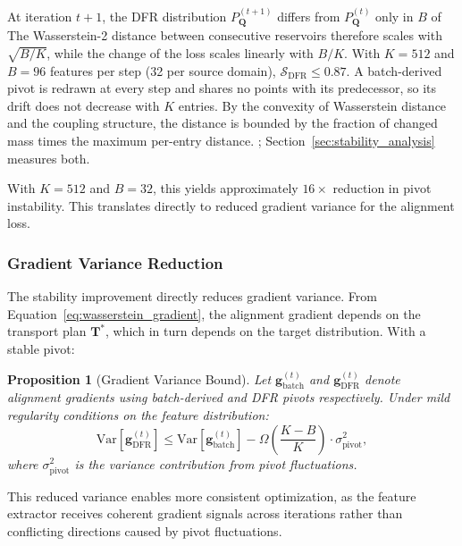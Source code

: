 \documentclass[preprint,12pt]{elsarticle}
\newtheorem{proposition}[theorem]{Proposition}
\providecommand{\DIFadd}[1]{{\protect\color{blue} \sf #1}} %
\providecommand{\DIFdel}[1]{{\protect\color{red} \scriptsize #1}} %
\providecommand{\DIFaddbegin}{} %
\providecommand{\DIFaddend}{} %
\providecommand{\DIFdelbegin}{} %
\providecommand{\DIFdelend}{} %
\newcommand{\DIFscaledelfig}{0.5}
\newlength{\DIFdelgraphicswidth} %
\newlength{\DIFdelgraphicsheight} %
\newcommand{\DIFaddincludegraphics}[2][]{{\color{blue}\fbox{\DIFOincludegraphics[#1]{#2}}}} %
\newcommand{\DIFdelincludegraphics}[2][]{%
\sbox{\DIFdelgraphicsbox}{\DIFOincludegraphics[#1]{#2}}%
\settoboxwidth{\DIFdelgraphicswidth}{\DIFdelgraphicsbox} %
\settoboxtotalheight{\DIFdelgraphicsheight}{\DIFdelgraphicsbox} %
\scalebox{\DIFscaledelfig}{%
\parbox[b]{\DIFdelgraphicswidth}{\usebox{\DIFdelgraphicsbox}\\[-\baselineskip] \rule{\DIFdelgraphicswidth}{0em}}\llap{\resizebox{\DIFdelgraphicswidth}{\DIFdelgraphicsheight}{%
\setlength{\unitlength}{\DIFdelgraphicswidth}%
\begin{picture}(1,1)%
\thicklines\linethickness{2pt} %
{\color[rgb]{1,0,0}\put(0,0){\framebox(1,1){}}}%
{\color[rgb]{1,0,0}\put(0,0){\line( 1,1){1}}}%
{\color[rgb]{1,0,0}\put(0,1){\line(1,-1){1}}}%
\end{picture}%
}\hspace*{3pt}}} %
} %
\DeclareRobustCommand{\DIFaddbegin}{\DIFOaddbegin \let\includegraphics\DIFaddincludegraphics} %
\DeclareRobustCommand{\DIFaddend}{\DIFOaddend \let\includegraphics\DIFOincludegraphics} %
\DeclareRobustCommand{\DIFdelbegin}{\DIFOdelbegin \let\includegraphics\DIFdelincludegraphics} %
\DeclareRobustCommand{\DIFdelend}{\DIFOaddend \let\includegraphics\DIFOincludegraphics} %
\begin{document}
\DIFdelbegin \DIFdel{At iteration $t+1$, the DFR distribution $P_{\mathbf{Q}}^{(t+1)}$ differs from $P_{\mathbf{Q}}^{(t)}$ only in $B$ of }\DIFdelend \DIFaddbegin \DIFadd{The Wasserstein-2 distance between consecutive reservoirs therefore scales with $\sqrt{B/K}$, while the change of the loss scales linearly with $B/K$. With $K=512$ and $B=96$ features per step (32 per source domain), $\mathcal S_{\text{DFR}}\le0.87$. A batch-derived pivot is redrawn at every step and shares no points with its predecessor, so its drift does not decrease with }\DIFaddend $K$\DIFdelbegin \DIFdel{entries. By the convexity of Wasserstein distance and the coupling structure, the distance is bounded by the fraction of changed mass times the maximum per-entry distance.
}\DIFdelend \DIFaddbegin \DIFadd{; Section~\ref{sec:stability_analysis} measures both.
}\DIFaddend 

\DIFdelbegin \DIFdel{With $K = 512$ and $B = 32$, this yields approximately $16\times$ reduction in pivot instability.
This translates directly to reduced gradient variance for the alignment loss.
}%

\DIFdelend \subsubsection{Gradient Variance Reduction}

The stability improvement directly reduces gradient variance. From Equation~\ref{eq:wasserstein_gradient}, the alignment gradient depends on the transport plan $\mathbf{T}^*$, which in turn depends on the target distribution. With a stable pivot:

\begin{proposition}[Gradient Variance Bound]
\label{prop:gradient_variance}
Let $\mathbf{g}_{\text{batch}}^{(t)}$ and $\mathbf{g}_{\text{DFR}}^{(t)}$ denote alignment gradients using batch-derived and DFR pivots respectively. Under mild regularity conditions on the feature distribution:
\begin{equation}
    \text{Var}\left[\mathbf{g}_{\text{DFR}}^{(t)}\right] \leq \text{Var}\left[\mathbf{g}_{\text{batch}}^{(t)}\right] - \Omega\left(\frac{K-B}{K}\right) \cdot \sigma^2_{\text{pivot}},
\end{equation}
where $\sigma^2_{\text{pivot}}$ is the variance contribution from pivot fluctuations.
\end{proposition}

This reduced variance enables more consistent optimization, as the feature extractor receives coherent gradient signals across iterations rather than conflicting directions caused by pivot fluctuations.
\end{document}
